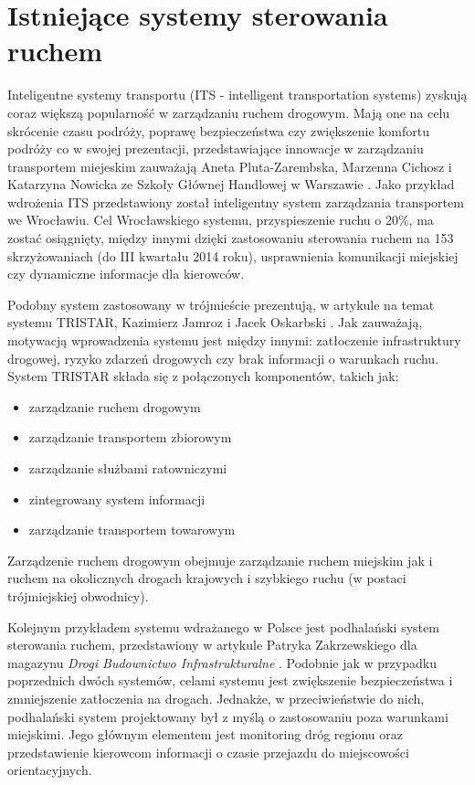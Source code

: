 \section{Istniejące systemy sterowania ruchem}
Inteligentne systemy transportu (ITS - intelligent transportation systems) zyskują coraz większą popularność w zarządzaniu ruchem drogowym.
Mają one na celu skrócenie czasu podróży, poprawę bezpieczeństwa czy zwiększenie komfortu podróży co w swojej prezentacji, przedstawiające innowacje w zarządzaniu transportem miejeskim zauważają Aneta Pluta-Zarembska, Marzenna Cichosz i Katarzyna Nowicka ze Szkoły Głównej Handlowej w Warszawie \cite{pluta-zaremba+cichosz+nowicka}. Jako przykład wdrożenia ITS przedstawiony został inteligentny system zarządzania transportem we Wrocławiu. Cel Wrocławskiego systemu, przyspieszenie ruchu o 20\%,  ma zostać osiągnięty, między innymi dzięki zastosowaniu sterowania ruchem na 153 skrzyżowaniach (do III kwartału 2014 roku), usprawnienia komunikacji miejskiej czy dynamiczne informacje dla kierowców.

Podobny system zastosowany w trójmieście prezentują, w artykule na temat systemu TRISTAR, Kazimierz Jamroz i Jacek Oskarbski \cite{jamroz+oskarbski}. Jak zauważają, motywacją wprowadzenia systemu jest między innymi: zatłoczenie infrastruktury drogowej, ryzyko zdarzeń drogowych czy brak informacji o warunkach ruchu. System TRISTAR składa się z połączonych komponentów, takich jak:
\begin{itemize}
	\item zarządzanie ruchem drogowym
	\item zarządzanie transportem zbiorowym
	\item zarządzanie służbami ratowniczymi
	\item zintegrowany system informacji
	\item zarządzanie transportem towarowym
\end{itemize}
Zarządzenie ruchem drogowym obejmuje zarządzanie ruchem miejskim jak i ruchem na okolicznych drogach krajowych i szybkiego ruchu (w postaci trójmiejskiej obwodnicy).

Kolejnym przykładem systemu wdrażanego w Polsce jest podhalański system sterowania ruchem, przedstawiony w artykule Patryka Zakrzewskiego dla magazynu \textit{Drogi Budownictwo Infrastrukturalne} \cite{zakrzewski}. Podobnie jak w przypadku poprzednich dwóch systemów, celami systemu jest zwiększenie bezpieczeństwa i zmniejszenie zatłoczenia na drogach. Jednakże, w przeciwieństwie do nich, podhalański system projektowany był z myślą o zastosowaniu poza warunkami miejskimi. Jego głównym elementem jest monitoring dróg regionu oraz przedstawienie kierowcom informacji o czasie przejazdu do miejscowości orientacyjnych.